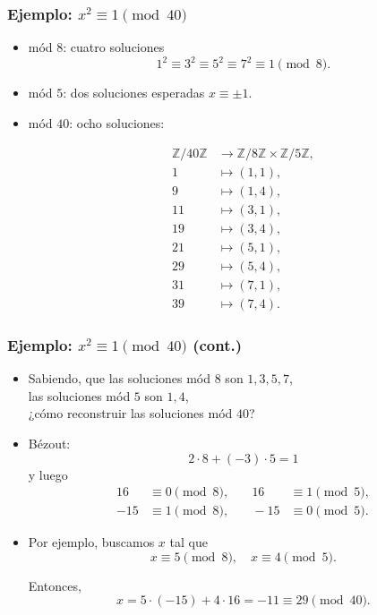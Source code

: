 \documentclass[handout]{beamer}
\newcommand{\ZZ}{\mathbb{Z}}
\begin{document}
\begin{frame}
  \frametitle{Ejemplo: $x^2 \equiv 1 \pmod{40}$}

  \begin{itemize}
  \item<2-> mód $8$: cuatro soluciones 
    $$1^2 \equiv 3^2 \equiv 5^2 \equiv 7^2 \equiv 1 \pmod{8}.$$

  \item<3-> mód $5$: dos soluciones esperadas $x \equiv \pm 1$.

  \item<4-> mód $40$: ocho soluciones:

    \begin{align*}
      \ZZ/40\ZZ & \to \ZZ/8\ZZ \times \ZZ/5\ZZ, \\
      1 & \mapsto (1, 1), \\
      9 & \mapsto (1, 4), \\
      11 & \mapsto (3, 1), \\
      19 & \mapsto (3, 4), \\
      21 & \mapsto (5, 1), \\
      29 & \mapsto (5, 4), \\
      31 & \mapsto (7, 1), \\
      39 & \mapsto (7, 4).
    \end{align*}
  \end{itemize}
\end{frame}


\begin{frame}
  \frametitle{Ejemplo: $x^2 \equiv 1 \pmod{40}$ (cont.)}

  \begin{itemize}
  \item<2-> Sabiendo, que las soluciones mód $8$ son $1,3,5,7$,\\
    las soluciones mód $5$ son $1,4$,\\
    ¿cómo reconstruir las soluciones mód $40$?

  \item<3-> Bézout:
    $$2\cdot 8 + (-3)\cdot 5 = 1$$
    y luego
    \begin{align*}
      16 & \equiv 0 \pmod{8}, & \quad 16 & \equiv 1 \pmod{5}, \\
      -15 & \equiv 1 \pmod{8}, & \quad -15 & \equiv 0 \pmod{5}.
    \end{align*}

  \item<4-> Por ejemplo, buscamos $x$ tal que
    \[ x \equiv 5 \pmod{8}, \quad x \equiv 4 \pmod{5}. \]

    Entonces,
    \[ x = 5\cdot (-15) + 4\cdot 16 = -11 \equiv 29 \pmod{40}. \]
  \end{itemize}
\end{frame}
\end{document}
